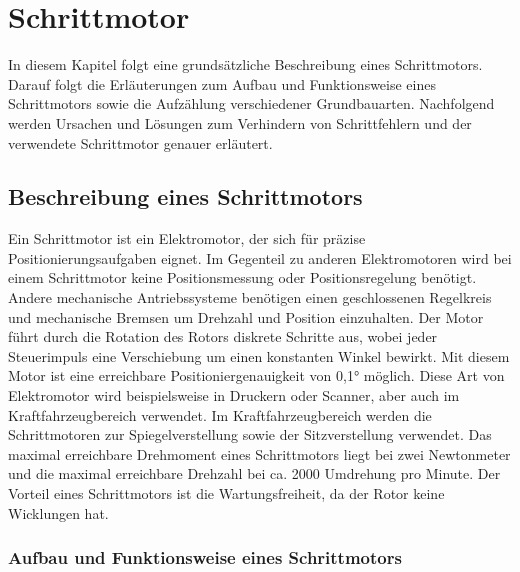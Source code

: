 %
%
%

\chapter{Schrittmotor}

In diesem Kapitel folgt eine grundsätzliche Beschreibung eines Schrittmotors. Darauf folgt die Erläuterungen zum Aufbau und Funktionsweise eines Schrittmotors sowie die Aufzählung verschiedener Grundbauarten. Nachfolgend werden Ursachen und Lösungen zum Verhindern von Schrittfehlern und der verwendete Schrittmotor genauer erläutert.

\section{Beschreibung eines Schrittmotors}

Ein Schrittmotor ist ein Elektromotor, der sich für präzise Positionierungsaufgaben eignet. Im Gegenteil zu anderen Elektromotoren wird bei einem Schrittmotor keine Positionsmessung oder Positionsregelung benötigt. Andere mechanische Antriebssysteme benötigen einen geschlossenen Regelkreis und mechanische Bremsen um Drehzahl und Position einzuhalten. Der Motor führt durch die Rotation des Rotors diskrete Schritte aus, wobei jeder Steuerimpuls eine Verschiebung um einen konstanten Winkel bewirkt. Mit diesem Motor ist eine erreichbare Positioniergenauigkeit von 0,1° möglich. Diese Art von Elektromotor wird beispielsweise in Druckern oder Scanner, aber auch im Kraftfahrzeugbereich verwendet. Im Kraftfahrzeugbereich werden die Schrittmotoren zur Spiegelverstellung sowie der Sitzverstellung verwendet. Das maximal erreichbare Drehmoment eines Schrittmotors liegt bei zwei Newtonmeter und die maximal erreichbare Drehzahl bei ca. 2000 Umdrehung pro Minute. Der Vorteil eines Schrittmotors ist die Wartungsfreiheit, da der Rotor keine Wicklungen hat. \cite{Babiel.2023}\cite{Hagl.2021}\cite{Bernstein.2018}\cite{Schroder.2021}

\subsection{Aufbau und Funktionsweise eines Schrittmotors}

